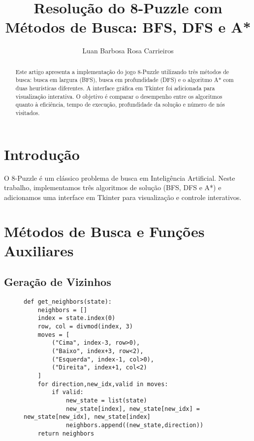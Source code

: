 \documentclass[sigconf]{acmart}
\title{Resolução do 8-Puzzle com Métodos de Busca: BFS, DFS e A*}
\author{Luan Barbosa Rosa Carrieiros}
\affiliation{
  \institution{PUC Minas}
  \city{Belo Horizonte}
  \state{MG}
  \country{Brasil}
}
\begin{document}
\begin{abstract}
Este artigo apresenta a implementação do jogo 8-Puzzle utilizando três métodos de busca: busca em largura (BFS), busca em profundidade (DFS) e o algoritmo A* com duas heurísticas diferentes. A interface gráfica em Tkinter foi adicionada para visualização interativa. O objetivo é comparar o desempenho entre os algoritmos quanto à eficiência, tempo de execução, profundidade da solução e número de nós visitados.
\end{abstract}


\maketitle

\section{Introdução}

O 8-Puzzle é um clássico problema de busca em Inteligência Artificial. Neste trabalho, implementamos três algoritmos de solução (BFS, DFS e A*) e adicionamos uma interface em Tkinter para visualização e controle interativos.

\section{Métodos de Busca e Funções Auxiliares}

\subsection{Geração de Vizinhos}
\begin{figure}[H]
\centering
\begin{lstlisting}[caption={Função get\_neighbors}]
def get_neighbors(state):
    neighbors = []
    index = state.index(0)
    row, col = divmod(index, 3)
    moves = [
        ("Cima", index-3, row>0),
        ("Baixo", index+3, row<2),
        ("Esquerda", index-1, col>0),
        ("Direita", index+1, col<2)
    ]
    for direction,new_idx,valid in moves:
        if valid:
            new_state = list(state)
            new_state[index], new_state[new_idx] = new_state[new_idx], new_state[index]
            neighbors.append((new_state,direction))
    return neighbors
\end{lstlisting}
\end{figure}
\end{document}
